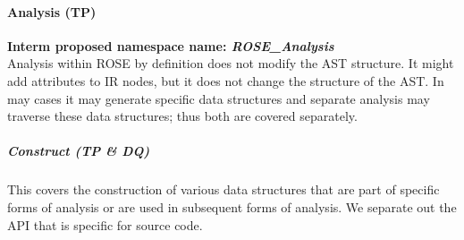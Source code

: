 \paragraph{Analysis (TP)}
{\bf Interm proposed namespace name: {\em ROSE\_Analysis}} \\
   Analysis within ROSE by definition does not modify the AST structure.
It might add attributes to IR nodes, but it does not change the structure 
of the AST.  In may cases it may generate specific data structures and
separate analysis may traverse these data structures; thus both are covered
separately.

\subparagraph{Construct (TP \& DQ)}
   This covers the construction of various data structures that are part of
specific forms of analysis or are used in subsequent forms of analysis.
We separate out the API that is specific for source code.
